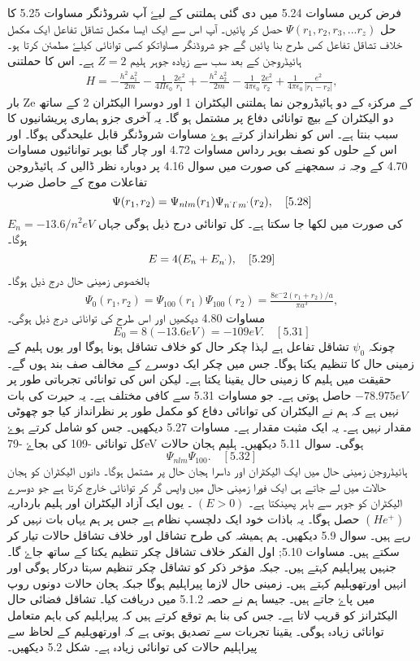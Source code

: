 فرض کریں مساوات 5.24 میں دی گئی ہملتنی کے لیۓ آپ شروڈنگر مساوات 5.25 کا حل $ \Psi(r_{1} , r_{2}, r_{3},...r_{z}) $ حصل کر پائیں۔ آپ اس سے ایک ایسا مکمل تشاقل تفاعل ایک مکمل خلاف تشاقل تفاعل کس طرح بنا پائیں گے جو شروڈنگر مساواتکو کسی توانائی کیلۓ مطمئن کرتا ہو۔
ہائیڈروجن کے بعد سب سے زیادہ جوہر ہلیم $ Z=2 $ ہے۔ اس کا حملتنی
\begin{align}
H= { -\frac{h^2 \vartriangle^2 _{1}}{2m} -\frac{1}{4\Pi\epsilon_{0}} \frac{2e^2}{r_{1}}} + { -\frac{h^2 \vartriangle^2 _{2}}{2m}-\frac{1}{4 \pi \epsilon_{0}} \frac{2e^2}{r_{2}}}+ \frac{1}{4 \pi \epsilon_{0}}\frac{e^2}{|r_{1} -r_{2}|},
\end{align}
بار Ze کے مرکزہ کے دو ہائیڈروجن نما ہملتنی الیکٹران 1 اور دوسرا الیکٹران 2 کے ساتھ دو الیکٹران کے بیچ توانائی دفاع پر مشتمل ہو گا۔ یہ آخری جزو ہماری پریشانیوں کا سبب بنتا ہے۔ اس کو نظرانداز کرتے ہوۓ مساوات شروڈنگر قابل علیحدگی ہوگا۔ اور اس کے حلوں کو نصف بوہر رداس مساوات 4.72 اور چار گنا بوہر توانائیوں مساوات 4.70 کے وجہ نہ سمجھنے کی صورت میں سوال 4.16 پر دوبارہ نظر ڈالیں کہ ہائیڈروجن تفاعلات موج کے حاصل ضرب 
$$ \Psi(r_{1}, r_{2})= \Psi_{nlm} (r_{1}) \Psi_{n^{`} l^{`} m^{`}} (r_{2}), \quad [5.28] $$
کی صورت میں لکھا جا سکتا ہے۔ کل توانائی درج ذیل ہوگی جہاں $ E_{n}=-13.6/n^2 eV $ ہوگا۔
$$ E= 4(E_{n} +E_{n^{`}}), \quad [5.29] $$
بالخصوص زمینی حال درج ذیل ہوگا۔
\begin{align}
\Psi_{0}(r_{1}, r_{2})=\Psi_{100}(r_{1}) \Psi_{100}(r_{2})=\frac{8e^-2(r_{1} + r_{2})/a}{\pi a^3},
\end{align}
مساوات 4.80 دیکھیں اور اس طرح کی توانائی درج ذیل ہوگی۔
$$ E_{0}=8(-13.6eV)=-109 eV . \quad [5.31] $$
چونکہ $ \psi_{0} $ تشاقل تفاعل ہے لہذا چکر حال کو خلاف تشاقل ہونا ہوگا اور یوں ہلیم کے زمینی حال کا تنظیم یکتا ہوگا۔ جس میں چکر ایک دوسرے کے مخالف صف بند ہوں گے۔ حقیقت میں ہلیم کا زمینی حال یقینا یکتا ہے۔ لیکن اس کی توانائی تجرباتی طور پر $ -78.975eV $ حاصل ہوتی ہے۔ جو مساوات 5.31 سے کافی مختلف ہے۔ یہ حیرت کی بات نہیں ہے کہ ہم نے الیکٹران کی توانائی دفاع کو مکمل طور پر نظرانداز کیا جو چھوٹی مقدار نہیں ہے۔ یہ ایک مثبت مقدار ہے۔ مساوات 5.27 دیکھیں۔ جس کو شامل کرتے ہوۓ کل توانائی  -109 کی بجاۓ -79eV ہوگی۔ سوال 5.11 دیکھیں۔ ہلیم ہجان حالات 
$$ \Psi_{nlm} \Psi_{100} . \quad [5.32] $$
ہائیڈروجن زمینی حال میں ایک الیکٹران اور داسرا ہجان حال پر مشتمل ہوگا۔ دانوں الیکٹران کو ہجان حالات میں لے جاتے ہی ایک فورا زمینی حال میں واپس گر کر توانائی خارج کرتا ہے جو دوسرے الیکٹران کو جوہر سے باہر  پھینکتا ہے۔ $ (E>0) $ ۔ یوں ایک آزاد الیکٹران اور ہلیم بارداریہ $ ( He^+ ) $ حصل ہوگا۔ یہ باذات خود ایک
دلچسپ نظام ہے جس پر ہم یہاں بات نہیں کر رہے ہیں۔ سوال 5.9 دیکھیں۔ ہم ہمیشہ کی طرح تشاقل اور خلاف تشاقل حالات تیار کر سکتے ہیں۔ مساوات 5.10;  اول الفکر خلاف تشاقل چکر تنظیم یکتا کے ساتھ جاۓ گا۔ جنہیں پیراہلیم کہتے ہیں۔ جبکہ مؤخر ذکر کو تشاقل چکر تنظیم سہتا درکار ہوگی اور انہیں اورتھوہلیم کہتے ہیں۔ زمینی حال لازما پیراہلیم ہوگا جبکہ ہجان حالات دونوں روپ میں پاۓ جاتے ہیں۔ جیسا ہم نے حصہ 5.1.2 میں دریافت کیا۔ تشاقل فضائی حال الیکٹرانز کو قریب لاتا ہے۔ جس کی بنا ہم توقع کرتے ہیں کہ پیراہلیم کی باہم متعامل توانائی زیادہ ہوگی۔ یقینا تجربات سے تصدیق ہوتی ہے کہ اورتھوہلیم کے لحاظ سے پیراہلیم حالات کی توانائی زیادہ ہے۔ شکل 5.2 دیکھیں۔
